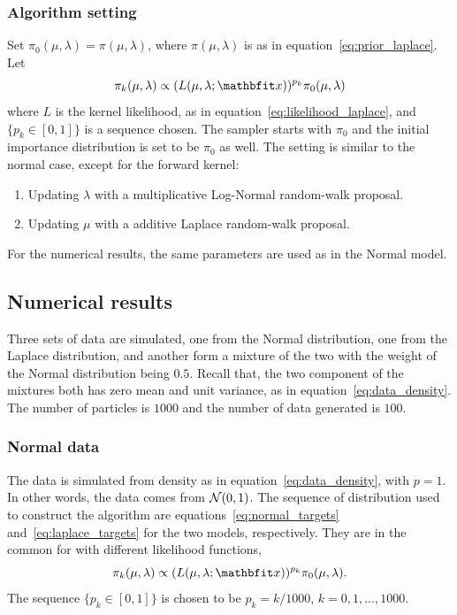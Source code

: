 \subsubsection{Algorithm setting}

Set $\pi_0(\mu,\lambda) = \pi(\mu,\lambda)$, where $\pi(\mu,\lambda)$ is as
in equation~\ref{eq:prior_laplace}. Let
\begin{equation}
  \pi_k(\mu,\lambda) \propto (L(\mu,\lambda;\bfx))^{p_k}\pi_0(\mu,\lambda)
  \label{eq:laplace_targets}
\end{equation}
where $L$ is the kernel likelihood, as in
equation~\eqref{eq:likelihood_laplace}, and $\{p_k\in[0,1]\}$ is a sequence
chosen. The \smc sampler starts with $\pi_0$ and the initial importance
distribution is set to be $\pi_0$ as well. The setting is similar to the
normal case, except for the forward kernel:
\begin{enumerate}
  \item Updating $\lambda$ with a multiplicative Log-Normal random-walk
    proposal.
  \item Updating $\mu$ with a additive Laplace random-walk proposal.
\end{enumerate}

\begin{remark}
  For the numerical results, the same parameters are used as in the Normal
  model.
\end{remark}

\subsection{Numerical results}
\label{sub:Numerical results}

Three sets of data are simulated, one from the Normal distribution, one from
the Laplace distribution, and another form a mixture of the two with the
weight of the Normal distribution being $0.5$. Recall that, the two
component of the mixtures both has zero mean and unit variance, as in
equation~\eqref{eq:data_density}. The number of particles is $1000$ and the
number of data generated is $100$.

\subsubsection{Normal data}

The data is simulated from density as in equation~\eqref{eq:data_density},
with $p = 1$. In other words, the data comes from $\mathcal{N}(0,1)$. The sequence
of distribution used to construct the \smc algorithm are
equations~\eqref{eq:normal_targets} and~\eqref{eq:laplace_targets} for the
two models, respectively. They are in the common for with different
likelihood functions,
\begin{equation*}
  \pi_k(\mu,\lambda) \propto (L(\mu,\lambda;\bfx))^{p_k}\pi_0(\mu,\lambda).
\end{equation*}
The sequence $\{p_k\in[0,1]\}$ is chosen to be $p_k = k / 1000$, $k = 0, 1,
\dots, 1000$.

